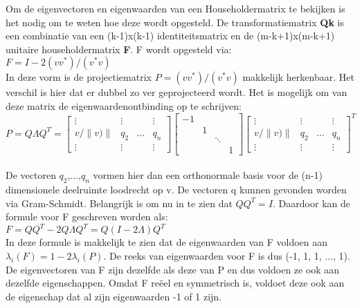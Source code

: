Om de eigenvectoren en eigenwaarden van een Householdermatrix te bekijken is het nodig om te weten hoe deze wordt opgesteld. De transformatiematrix \textbf{Qk} is een combinatie van een (k-1)x(k-1) identiteitsmatrix en de (m-k+1)x(m-k+1) unitaire householdermatrix \textbf{F}. F wordt opgesteld  via:\\

$F = I -2(vv^{*})/(v^{*}v)$\\

In deze vorm is de projectiematrix $P = (vv^{*})/(v^{*}v)$ makkelijk herkenbaar. Het verschil is hier dat er dubbel zo ver geprojecteerd wordt. Het is mogelijk om van deze matrix de eigenwaardenontbinding op te schrijven:\\

\[
P = Q \Lambda Q^{T} = 
\begin{bmatrix}
    \vdots      & \vdots &  & \vdots\\
    v/\|v)\| & q_{2} & \dots & q_{n}\\
   \vdots      & \vdots &  & \vdots
\end{bmatrix}
\begin{bmatrix}
    -1\\
      & 1\\
      &   &  \ddots\\
	& & & 1
\end{bmatrix}
\begin{bmatrix}
    \vdots      & \vdots &  & \vdots\\
    v/\|v)\| & q_{2} & \dots & q_{n}\\
   \vdots      & \vdots &  & \vdots
\end{bmatrix}^{T}
\]\\

De vectoren $q_{2}$,...,$q_{n}$ vormen hier dan een orthonormale basis voor de (n-1) dimensionele deelruimte loodrecht op v. De vectoren q kunnen gevonden worden via Gram-Schmidt. Belangrijk is om nu in te zien dat $QQ^{T} = I$. Daardoor kan de formule voor F geschreven worden als:\\

$F = QQ^{T} - 2Q \Lambda Q^{T} = Q(I - 2\Lambda)Q^{T}$\\

In deze formule is makkelijk te zien dat de eigenwaarden van F voldoen aan $\lambda_{i}(F) = 1-2\lambda_{i}(P)$. De reeks van eigenwaarden voor F is dus (-1, 1, 1, ..., 1). De eigenvectoren van F zijn dezelfde als deze van P en dus voldoen ze ook aan dezelfde eigenschappen. Omdat F reëel en symmetrisch is, voldoet deze ook aan de eigenschap dat al zijn eigenwaarden -1 of 1 zijn.

